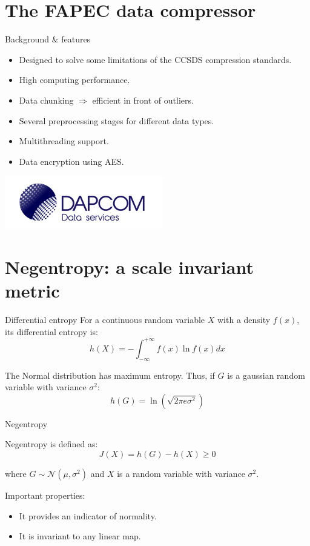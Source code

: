 \documentclass[usenames,dvipsnames]{beamer}
\begin{document}
\section{The FAPEC data compressor}
\begin{frame}{Background \& features}
\begin{itemize}
	\item<1-> Designed to solve some limitations of the CCSDS compression standards.
	\item<2-> High computing performance.
	\item<3-> Data chunking $\Rightarrow$ efficient in front of outliers.
	\item<4-> Several preprocessing stages for different data types.
	\item<5-> Multithreading support.
	\item<6-> Data encryption using AES.
\end{itemize}
\vspace{2.5em}
\hfill\includegraphics[scale=0.5]{graphics/dapcom-logo-header-small.png}
\end{frame}

\section{Negentropy: a scale invariant metric}
\begin{frame}{Differential entropy}
For a continuous random variable $X$ with a density $f(x)$, its differential entropy is:
\[
h(X) = - \int_{-\infty}^{+\infty} f(x) \ln f(x) dx
\]

The Normal distribution has maximum entropy. Thus, if $G$ is a gaussian random variable with variance $\sigma^2$:
\[
h(G) = \ln \left(\sqrt{2 \pi e \sigma^2}\right)
\]
\end{frame}

\begin{frame}{Negentropy}
	
Negentropy is defined as:
\[
J(X) = h(G) - h(X) \geq 0
\]

where $G \sim \mathscr{N}(\mu, \sigma^2)$ and $X$ is a random variable with variance $\sigma^2$.
\vspace{1em}

Important properties:
\begin{itemize}
	\item It provides an indicator of normality.
	\item It is invariant to any linear map.
\end{itemize}
\end{frame}
\end{document}
